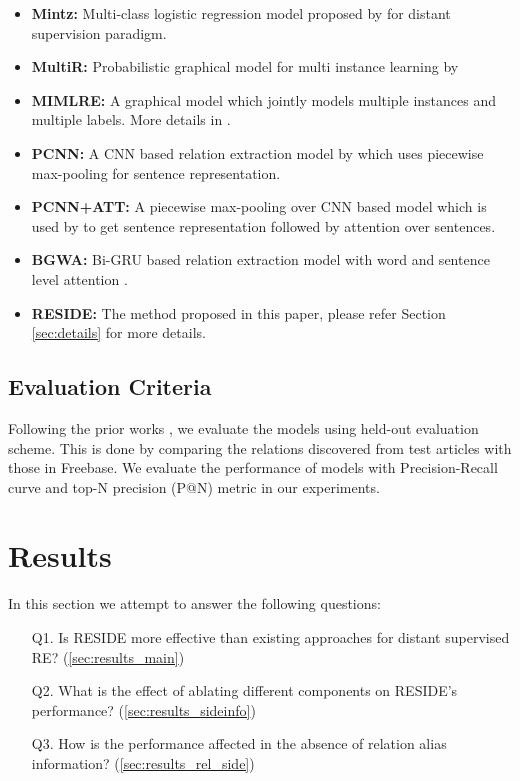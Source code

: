 \documentclass[11pt,a4paper]{article}
\newcommand{\refsec}[1]{Section \ref{#1}}
\newcommand{\method}{RESIDE}
\begin{document}
\begin{itemize}[itemsep=2pt,parsep=0pt,partopsep=0pt,leftmargin=*]
	\item \textbf{Mintz:} Multi-class logistic regression model proposed by \cite{mintz2009distant} for distant supervision paradigm.
	\item \textbf{MultiR:} Probabilistic graphical model for multi instance learning by \cite{hoffmann2011knowledge} 
\item \textbf{MIMLRE:} A graphical model which jointly models multiple instances and multiple labels. More details in \cite{surdeanu2012multi}.
	\item \textbf{PCNN:} A CNN based relation extraction model by \cite{zeng2015distant} which uses piecewise max-pooling for sentence representation.
	\item \textbf{PCNN+ATT:} A piecewise max-pooling over CNN based model which is used by \cite{lin2016neural} to get sentence representation followed by attention over sentences.
	\item \textbf{BGWA:} Bi-GRU based relation extraction model with word and sentence level attention \cite{bgwa_paper}.
	\item \textbf{\method{}:} The method proposed in this paper, please refer \refsec{sec:details} for more details.
\end{itemize}

\subsection{Evaluation Criteria}
Following the prior works \cite{lin2016neural,feng2017effective}, we evaluate the models using held-out evaluation scheme. This is done by comparing the relations discovered from test articles with those in Freebase. We evaluate the performance of models with Precision-Recall curve and top-N precision (P@N) metric in our experiments.

 \section{Results}
\label{sec:results}

In this section we attempt to answer the following questions:
\begin{itemize}[itemsep=2pt,topsep=4pt,parsep=0pt,partopsep=0pt]
	\item[Q1.] Is \method{} more effective than existing approaches for distant supervised RE? (\ref{sec:results_main})
	\item[Q2.] What is the effect of ablating different components on \method{}'s performance? (\ref{sec:results_sideinfo})
	\item[Q3.] How is the performance affected in the absence of relation alias information? (\ref{sec:results_rel_side})
\end{itemize}
\end{document}
